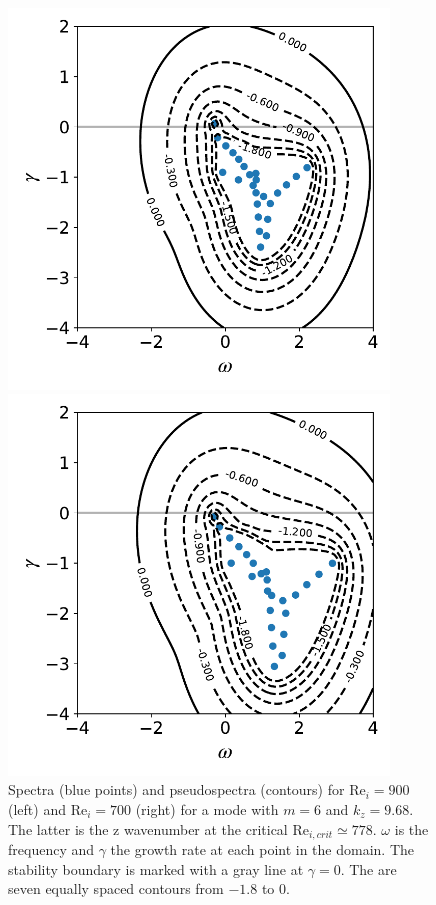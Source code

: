 \documentclass[openacc]{rstransa}%
\newcommand{\Reyn}{\mathrm{Re}}
\begin{document}
\begin{figure}
    \centering
    \centering
    \begin{minipage}{0.45\textwidth}
        \centering
        \includegraphics[width=0.9\textwidth]{figs/TC_pseudospectrum_Re1_900.00_eta_0.8830_mu_-3.3333_nr_64_m_6_kz_ 9.68.pdf}
    \end{minipage}
    \begin{minipage}{0.45\textwidth}
        \centering
        \includegraphics[width=0.9\textwidth]{figs/TC_pseudospectrum_Re1_700.00_eta_0.8830_mu_-4.2857_nr_64_m_6_kz_ 9.68.pdf}
    \end{minipage}
    \caption{Spectra (blue points) and pseudospectra (contours) for $\Reyn_i = 900$ (left) and $\Reyn_i = 700$ (right) for a mode with $m=6$ and $k_z = 9.68$. The latter is the z wavenumber at the critical $\Reyn_{i,crit} \simeq 778$. $\omega$ is the frequency and $\gamma$ the growth rate at each point in the domain. The stability boundary is marked with a gray line at $\gamma = 0$. The are seven equally spaced contours from $-1.8$ to 0.}
    \label{fig:pseudospectra}
\end{figure}
\end{document}
